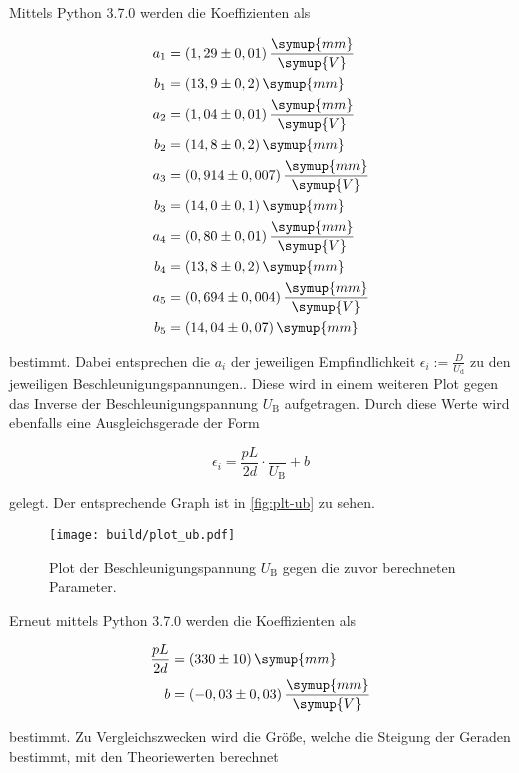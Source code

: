 Mittels Python 3.7.0 werden die Koeffizienten als

\begin{align*}
  a_1 &= (1,29 \pm 0,01) \, \frac{\symup{mm}}{\symup{V}} \\
  b_1 &= (13,9 \pm 0,2) \, \symup{mm} \\
  a_2 &= (1,04 \pm 0,01) \, \frac{\symup{mm}}{\symup{V}} \\
  b_2 &= (14,8 \pm 0,2) \, \symup{mm} \\
  a_3 &= (0,914 \pm 0,007) \, \frac{\symup{mm}}{\symup{V}} \\
  b_3 &= (14,0 \pm 0,1) \, \symup{mm} \\
  a_4 &= (0,80 \pm 0,01) \, \frac{\symup{mm}}{\symup{V}} \\
  b_4 &= (13,8 \pm 0,2) \, \symup{mm} \\
  a_5 &= (0,694 \pm 0,004) \, \frac{\symup{mm}}{\symup{V}} \\
  b_5 &= (14,04 \pm 0,07) \, \symup{mm}
\end{align*}

bestimmt. Dabei entsprechen die $a_i$ der jeweiligen Empfindlichkeit $\epsilon_i := \frac{D}{U_\text{d}}$ zu den jeweiligen Beschleunigungspannungen..
Diese wird in einem weiteren Plot gegen das Inverse der Beschleunigungspannung $U_\text{B}$ aufgetragen.
Durch diese Werte wird ebenfalls eine Ausgleichsgerade der Form

\begin{equation}
  \epsilon_i = \frac{p L}{2 d} \cdot \frac{}{U_\text{B}} + b
\end{equation}

gelegt. Der entsprechende Graph ist in \autoref{fig:plt-ub} zu sehen.

\begin{figure}
  \centering
  \texttt{[image: build/plot\_ub.pdf]}
  \caption{Plot der Beschleunigungspannung $U_\text{B}$ gegen die zuvor berechneten Parameter.}
  \label{fig:plt-ub}
\end{figure}

Erneut mittels Python 3.7.0 werden die Koeffizienten als

\begin{align*}
  \frac{p L}{2 d} &= (330 \pm 10) \, \symup{mm} \\
  b &= (-0,03 \pm 0,03) \, \frac{\symup{mm}}{\symup{V}}
\end{align*}

bestimmt. Zu Vergleichszwecken wird die Größe, welche die Steigung der Geraden bestimmt, mit den Theoriewerten berechnet

